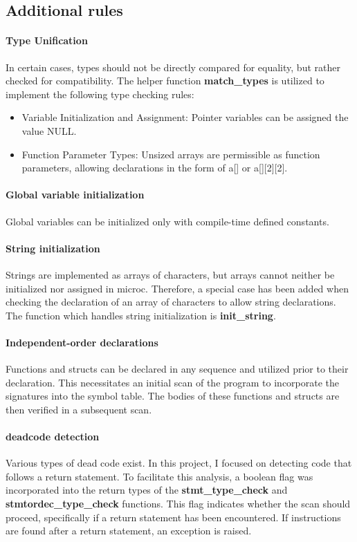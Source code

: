 \documentclass{article}
\begin{document}
\subsection{Additional rules}
\paragraph*{Type Unification}
   In certain cases, types should not be directly compared for equality, but rather checked for compatibility.
   The helper function \textbf{match\_types} is utilized to implement the following type checking rules:
  \begin{itemize}
    \item Variable Initialization and Assignment: Pointer variables can be assigned the value NULL.
    \item Function Parameter Types: Unsized arrays are permissible as function parameters, allowing declarations in the form of a[] or a[][2][2].
  \end{itemize}

\paragraph*{Global variable initialization}
Global variables can be initialized only with compile-time defined constants.

\paragraph*{String initialization}
Strings are implemented as arrays of characters, but arrays cannot neither be initialized nor assigned in microc.
Therefore, a special case has been added when checking the declaration of an array of characters to allow string declarations.
The function which handles string initialization is \textbf{init\_string}.

\paragraph*{Independent-order declarations}
Functions and structs can be declared in any sequence and utilized prior to their declaration.
This necessitates an initial scan of the program to incorporate the signatures into the symbol table.
The bodies of these functions and structs are then verified in a subsequent scan.

\paragraph*{deadcode detection}
Various types of dead code exist. In this project, I focused on detecting code that follows a return statement.
To facilitate this analysis, a boolean flag was incorporated into the return types of the \textbf{stmt\_type\_check}
and \textbf{stmtordec\_type\_check} functions. This flag indicates whether the scan should proceed, specifically if
a return statement has been encountered. If instructions are found after a return statement, an exception is raised.
\end{document}
